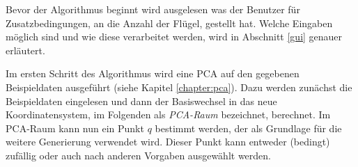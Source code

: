 \vspace{0.1cm}

Bevor der Algorithmus beginnt wird ausgelesen was der Benutzer für Zusatzbedingungen, \zb an die Anzahl der Flügel, gestellt hat. Welche Eingaben möglich sind und wie diese verarbeitet werden, wird in Abschnitt \ref{gui} genauer erläutert.

Im ersten Schritt des Algorithmus wird eine PCA auf den gegebenen Beispieldaten ausgeführt (siehe Kapitel \ref{chapter:pca}). Dazu werden zunächst die Beispieldaten eingelesen und dann der Basiswechsel in das neue Koordinatensystem, im Folgenden als \emph{PCA-Raum} bezeichnet, berechnet. Im PCA-Raum kann nun ein Punkt $q$ bestimmt werden, der als Grundlage für die weitere Generierung verwendet wird. Dieser Punkt kann entweder (bedingt) zufällig oder auch nach anderen Vorgaben ausgewählt werden. 

